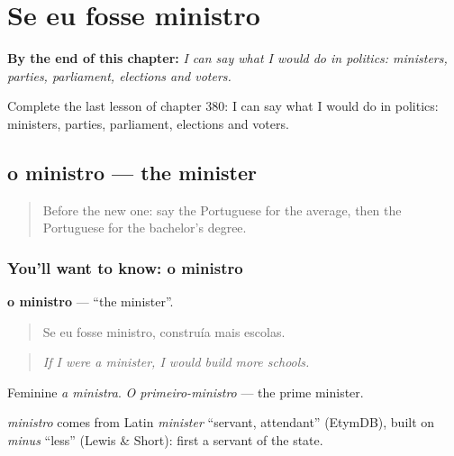 
\chapter{Se eu fosse ministro}
\label{ch:pt-se-eu-fosse-ministro}

\begin{chapteropening}
\textbf{By the end of this chapter:} \emph{I can say what I would do in politics: ministers, parties, parliament, elections and voters.}

Complete the last lesson of chapter 380: I can say what I would do in politics: ministers, parties, parliament, elections and voters.
\end{chapteropening}

\section[o ministro]{o ministro — the minister}

\label{lesson:PT-C380-ministro}



\begin{quote}
Before the new one: say the Portuguese for the average, then the Portuguese for the bachelor's degree.
\end{quote}

\subsection*{You'll want to know: o ministro}
\textbf{o ministro} — \textquotedblleft{}the minister\textquotedblright{}.

\begin{quote}
Se eu fosse ministro, construía mais escolas.
\end{quote}

\begin{quote}
\emph{If I were a minister, I would build more schools.}
\end{quote}

Feminine \emph{a ministra}. \emph{O primeiro-ministro} — the prime minister.

\begin{cousinweb}
\emph{ministro} comes from Latin \emph{minister} \textquotedblleft{}servant, attendant\textquotedblright{} (EtymDB), built on \emph{minus} \textquotedblleft{}less\textquotedblright{} (Lewis \& Short): first a servant of the state.
\end{cousinweb}


